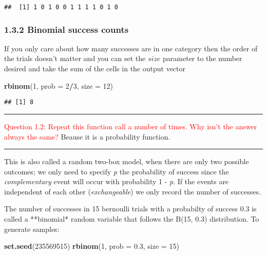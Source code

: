 \documentclass[]{article}
\newenvironment{Shaded}{\begin{snugshade}}{\end{snugshade}}
\newcommand{\KeywordTok}[1]{\textcolor[rgb]{0.13,0.29,0.53}{\textbf{#1}}}
\newcommand{\DataTypeTok}[1]{\textcolor[rgb]{0.13,0.29,0.53}{#1}}
\newcommand{\DecValTok}[1]{\textcolor[rgb]{0.00,0.00,0.81}{#1}}
\newcommand{\FloatTok}[1]{\textcolor[rgb]{0.00,0.00,0.81}{#1}}
\newcommand{\OperatorTok}[1]{\textcolor[rgb]{0.81,0.36,0.00}{\textbf{#1}}}
\newcommand{\NormalTok}[1]{#1}
\let\oldrule=\rule
\renewcommand{\rule}[1]{\oldrule{\linewidth}}
\begin{document}
\begin{verbatim}
##  [1] 1 0 1 0 0 1 1 1 1 0 1 0
\end{verbatim}

\subsubsection{1.3.2 Binomial success
counts}\label{binomial-success-counts}

If you only care about how many successes are in one category then the
order of the trials doesn't matter and you can set the \(size\)
parameter to the number desired and take the sum of the cells in the
output vector

\begin{Shaded}
\begin{Highlighting}[]
\KeywordTok{rbinom}\NormalTok{(}\DecValTok{1}\NormalTok{, }\DataTypeTok{prob =} \DecValTok{2}\OperatorTok{/}\DecValTok{3}\NormalTok{, }\DataTypeTok{size =} \DecValTok{12}\NormalTok{)}
\end{Highlighting}
\end{Shaded}

\begin{verbatim}
## [1] 8
\end{verbatim}

\begin{center}\rule{0.5\linewidth}{\linethickness}\end{center}

\textcolor{red}{Question 1.2: Repeat this function call a number of times. Why isn't the answer always the same?}
Beause it is a probability function.

\begin{center}\rule{0.5\linewidth}{\linethickness}\end{center}

This is also called a random two-box model, when there are only two
possible outcomes; we only need to specify \emph{p} the probability of
success since the \emph{complementary} event will occur with probability
1 - \emph{p}. If the events are independent of each other
(\emph{exchangeable}) we only record the number of successes.

The number of successes in 15 bernoulli trials with a probabilty of
success 0.3 is called a **binomial* random variable that follows the
B(15, 0.3) distribution. To generate samples:

\begin{Shaded}
\begin{Highlighting}[]
\KeywordTok{set.seed}\NormalTok{(}\DecValTok{235569515}\NormalTok{)}
\KeywordTok{rbinom}\NormalTok{(}\DecValTok{1}\NormalTok{, }\DataTypeTok{prob =} \FloatTok{0.3}\NormalTok{, }\DataTypeTok{size =} \DecValTok{15}\NormalTok{)}
\end{Highlighting}
\end{Shaded}
\end{document}
